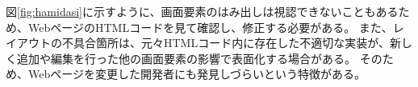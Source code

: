 \par
図\ref{fig:hamidasi}に示すように、画面要素のはみ出しは視認できないこともあるため、WebページのHTMLコードを見て確認し、修正する必要がある。
また、レイアウトの不具合箇所は、元々HTMLコード内に存在した不適切な実装が、新しく追加や編集を行った他の画面要素の影響で表面化する場合がある。
そのため、Webページを変更した開発者にも発見しづらいという特徴がある。


